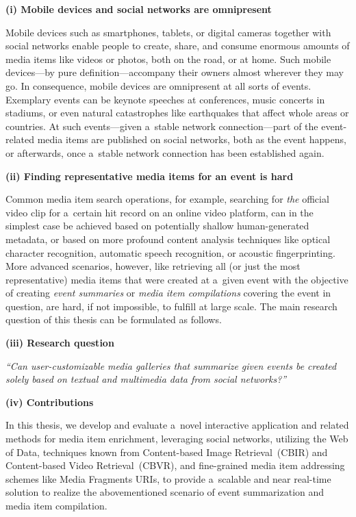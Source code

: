 \begin{abstracts}

\textbf{(i) Mobile devices and social networks are omnipresent}

Mobile devices such as smartphones, tablets, or digital cameras
together with social networks enable people to create,
share, and consume enormous amounts of media items
like videos or photos, both on the road, or at home.
Such mobile devices---by pure definition---accompany
their owners almost wherever they may go.
In consequence, mobile devices are omnipresent
at all sorts of events.
Exemplary events can be keynote speeches at conferences,
music concerts in stadiums,
or even natural catastrophes like earthquakes
that affect whole areas or countries.
At such events---given a~stable network connection---part of
the event-related media items are published on social networks,
both as the event happens, or afterwards,
once a~stable network connection has been established again.

\textbf{(ii) Finding representative media items
for an event is hard}

Common media item search operations,
for example, searching for \emph{the} official video clip
for a~certain hit record on an online video platform,
can in the simplest case be achieved based on potentially
shallow human-generated metadata,
or based on more profound content analysis techniques
like optical character recognition,
automatic speech recognition,
or acoustic fingerprinting.
More advanced scenarios, however, like retrieving all
(or just the most representative) media items
that were created at a~given event
with the objective of creating \emph{event summaries} or
\emph{media item compilations} covering the event in question,
are hard, if not impossible, to fulfill at large scale.
The main research question of this thesis
can be formulated as follows.

\textbf{(iii) Research question}

\textit{``Can user-customizable media galleries
that summarize given events be\linebreak
created solely based on textual and multimedia data
from social networks?''}

\textbf{(iv) Contributions}

In this thesis, we develop and evaluate
a~novel interactive application and related methods
for media item enrichment,
leveraging social networks, utilizing the Web of Data,
techniques known from Content-based Image Retrieval~(CBIR)
and Content-based Video Retrieval~(CBVR),
and fine-grained media item addressing schemes
like Media Fragments URIs,
to provide a~scalable and near real-time solution
to realize the abovementioned scenario
of event summarization and media item compilation.


\end{abstracts}
